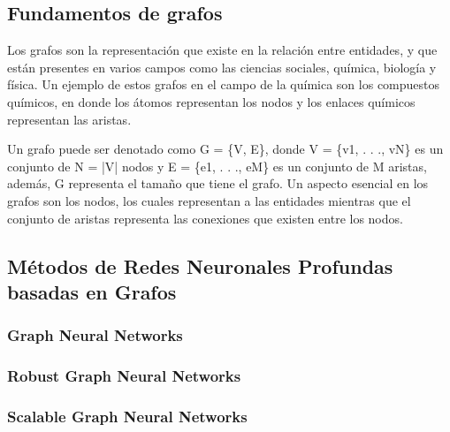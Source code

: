 \subsection{Fundamentos de grafos}
Los grafos son la representación que existe en la relación entre entidades, y que están presentes en varios campos como las ciencias sociales, química, biología y física. Un ejemplo de estos grafos en el campo de la química son los compuestos químicos, en donde los átomos representan los nodos y los enlaces químicos representan las aristas.

Un grafo puede ser denotado como G = \{V, E\}, donde V = \{v1, . . ., vN\} es un conjunto de N = |V| nodos y E = \{e1, . . ., eM\} es un conjunto de M aristas, además, G representa el tamaño que tiene el grafo. Un aspecto esencial en los grafos son los nodos, los cuales representan a las entidades mientras que el conjunto de aristas representa las conexiones que existen entre los nodos. 



\subsection{Métodos de Redes Neuronales Profundas basadas en Grafos}
\subsubsection{Graph Neural Networks}
\subsubsection{Robust Graph Neural Networks}
\subsubsection{Scalable Graph Neural Networks}